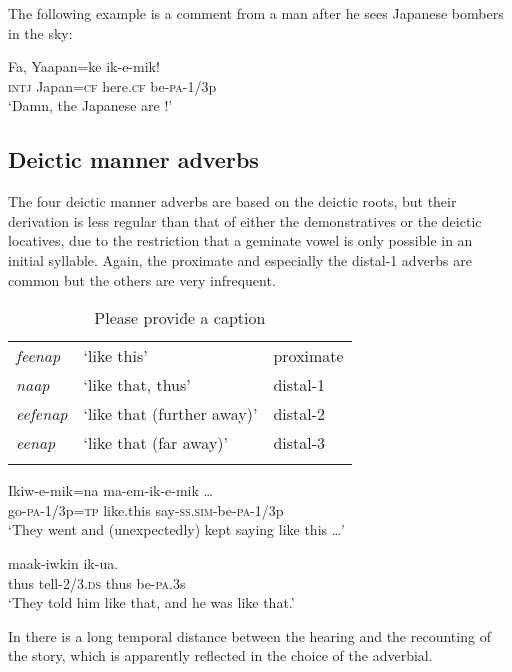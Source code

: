 The following example is a comment from a man after he sees Japanese bombers in the sky:

\ea%
\label{ex:3:x1572}
\gll Fa, Yaapan=ke  ik-e-mik! \\
\textsc{intj} Japan=\textsc{cf} here.\textsc{cf} be-\textsc{pa}-1/3p\\
\glt`Damn, the Japanese are !'
\z

\subsection{Deictic manner adverbs}\label{sec:3.6.4}
{}
The four deictic manner adverbs are based on the deictic roots, but their derivation is less regular than that of either the demonstratives or the deictic locatives, due to the restriction that a geminate vowel is only possible in an initial syllable. Again, the proximate and especially the distal-1 adverbs are common but the others are very infrequent.

\begin{table}
\caption{Please provide a caption}
\label{} 
\begin{tabular}{>{\itshape}lll}
\mytoprule
feenap &`like this' &proximate\\
naap &`like that, thus' &distal-1\\
eefenap &`like that (further away)' &distal-2\\
eenap &`like that (far away)' &distal-3\\
\mybottomrule
\end{tabular}
\end{table}


\ea%
\label{ex:3:x701}
\gll Ikiw-e-mik=na  ma-em-ik-e-mik {\dots} \\
go-\textsc{pa}-1/3p=\textsc{tp} like.this say-\textsc{ss}.\textsc{sim}-be-\textsc{pa}-1/3p\\
\glt`They went and (unexpectedly) kept saying like this {\dots}'
\z

\ea%
\label{ex:3:x702}
\gll {} maak-iwkin  ik-ua. \\
thus tell-2/3.\textsc{ds} thus be-\textsc{pa}.3s\\
\glt`They told him like that, and he was like that.'
\z

In  there is a long temporal distance between the hearing and the recounting of the story, which is apparently reflected in the choice of the adverbial.

